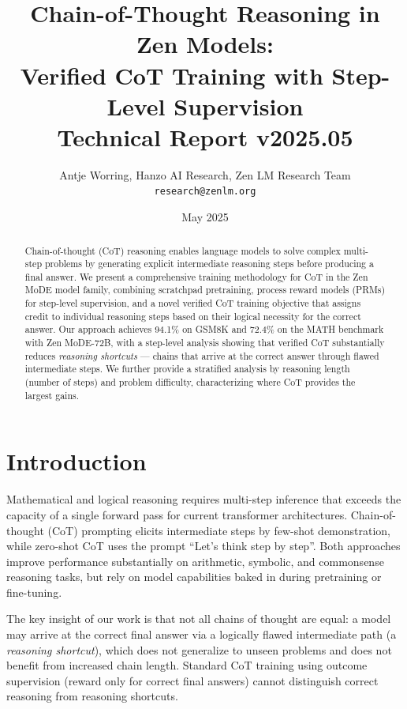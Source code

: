 \documentclass[11pt,a4paper]{article}
\title{\textbf{Chain-of-Thought Reasoning in Zen Models:\\
Verified CoT Training with Step-Level Supervision}\\
\large Technical Report v2025.05}
\author{Antje Worring, Hanzo AI Research, Zen LM Research Team\\
\texttt{research@zenlm.org}}
\date{May 2025}
\begin{document}
\maketitle

\begin{abstract}
Chain-of-thought (CoT) reasoning enables language models to solve complex multi-step
problems by generating explicit intermediate reasoning steps before producing a final
answer. We present a comprehensive training methodology for CoT in the Zen MoDE model
family, combining scratchpad pretraining, process reward models (PRMs) for step-level
supervision, and a novel verified CoT training objective that assigns credit to
individual reasoning steps based on their logical necessity for the correct answer.
Our approach achieves 94.1\% on GSM8K and 72.4\% on the MATH benchmark with Zen MoDE-72B,
with a step-level analysis showing that verified CoT substantially reduces \emph{reasoning
shortcuts} — chains that arrive at the correct answer through flawed intermediate steps.
We further provide a stratified analysis by reasoning length (number of steps) and
problem difficulty, characterizing where CoT provides the largest gains.
\end{abstract}

\tableofcontents
\newpage

\section{Introduction}
\label{sec:intro}

Mathematical and logical reasoning requires multi-step inference that exceeds the
capacity of a single forward pass for current transformer architectures. Chain-of-thought
(CoT) prompting \cite{wei2022cot} elicits intermediate steps by few-shot demonstration,
while zero-shot CoT \cite{kojima2022zeroshot} uses the prompt ``Let's think step by step''.
Both approaches improve performance substantially on arithmetic, symbolic, and commonsense
reasoning tasks, but rely on model capabilities baked in during pretraining or fine-tuning.

The key insight of our work is that not all chains of thought are equal: a model may
arrive at the correct final answer via a logically flawed intermediate path (a
\emph{reasoning shortcut}), which does not generalize to unseen problems and does not
benefit from increased chain length. Standard CoT training using outcome supervision
(reward only for correct final answers) cannot distinguish correct reasoning from
reasoning shortcuts.
\end{document}
